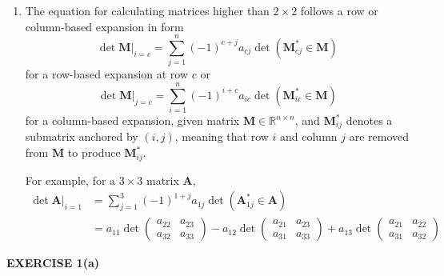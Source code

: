 \documentclass[12pt]{article}
\newcommand{\mat}[1]{\mathbf{#1}}
\newcommand{\exercise}[1]{\textbf{EXERCISE #1}\label{#1}}
\begin{document}
\begin{enumerate}
\item The equation for calculating matrices higher than $2 \times 2$ follows a row or column-based expansion in form
\begin{equation}
\det \mat{M} \bigg\rvert_{i=c} = \sum^{n}_{j = 1} (-1)^{c+j} a_{cj} \det( \mat{M}^{*}_{cj} \in \mat{M} )
\end{equation}
for a row-based expansion at row $c$ or
\begin{equation}
\det \mat{M} \bigg\rvert_{j=c} = \sum^{n}_{i = 1} (-1)^{i+c} a_{ic} \det( \mat{M}^{*}_{ic} \in \mat{M} )
\end{equation}
for a column-based expansion, given matrix $\mat{M} \in \mathbb{R}^{n \times n}$, and $\mat{M}^{*}_{ij}$ denotes a submatrix anchored by $(i,j)$, meaning that row $i$ and column $j$ are removed from $\mat{M}$ to produce $\mat{M}^{*}_{ij}$. 

For example, for a $3 \times 3$ matrix $\mat{A}$,
\begin{align*}
\det \mat{A} \bigg\rvert_{i=1} 
&= \sum_{j = 1}^{3} (-1)^{1+j} a_{1j} \det ( \mat{A}^{*}_{1j} \in \mat{A} ) \\
&= a_{11} \det \begin{pmatrix}
  a_{22} & a_{23} \\
  a_{32} & a_{33}
\end{pmatrix} -
a_{12} \det \begin{pmatrix}
  a_{21} & a_{23} \\
  a_{31} & a_{33}
\end{pmatrix} +
a_{13} \det \begin{pmatrix}
  a_{21} & a_{22} \\
  a_{31} & a_{32}
\end{pmatrix}
\end{align*}
\end{enumerate}

\newpage
\exercise{1(a)}
\end{document}
